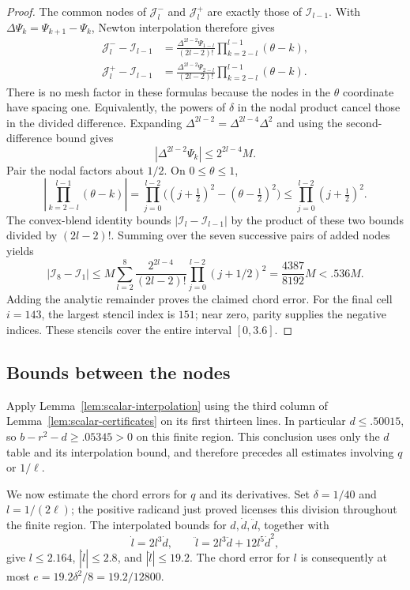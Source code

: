 \begin{proof}
The common nodes of \(\mathcal J_l^-\) and \(\mathcal J_l^+\) are
exactly those of \(\mathcal I_{l-1}\). With
\(\Delta\Psi_k=\Psi_{k+1}-\Psi_k\), Newton interpolation therefore gives
\[
\begin{aligned}
 \mathcal J_l^--\mathcal I_{l-1}
  &=\frac{\Delta^{2l-2}\Psi_{1-l}}{(2l-2)!}
       \prod_{k=2-l}^{l-1}(\theta-k),\\
 \mathcal J_l^+-\mathcal I_{l-1}
  &=\frac{\Delta^{2l-2}\Psi_{2-l}}{(2l-2)!}
       \prod_{k=2-l}^{l-1}(\theta-k).
\end{aligned}
\]
There is no mesh factor in these formulas because the nodes in the
\(\theta\) coordinate have spacing one. Equivalently, the powers of
\(\delta\) in the nodal product cancel those in the divided difference.
Expanding \(\Delta^{2l-2}=\Delta^{2l-4}\Delta^2\) and using the
second-difference bound gives
\[
 |\Delta^{2l-2}\Psi_k|\le 2^{2l-4}M.
\]
Pair the nodal factors about \(1/2\). On \(0\le\theta\le1\),
\[
 \left|\prod_{k=2-l}^{l-1}(\theta-k)\right|
 =\prod_{j=0}^{l-2}\big((j+\tfrac12)^2-(\theta-\tfrac12)^2\big)
 \le\prod_{j=0}^{l-2}(j+\tfrac12)^2.
\]
The convex-blend identity bounds \(|\mathcal I_l-\mathcal I_{l-1}|\)
by the product of these two bounds divided by \((2l-2)!\).
Summing over the seven successive pairs of added nodes yields
\[
 |\mathcal I_8-\mathcal I_1|
 \le M\sum_{l=2}^8
      \frac{2^{2l-4}}{(2l-2)!}\prod_{j=0}^{l-2}(j+1/2)^2
 =\frac{4387}{8192}M<.536M.
\]
Adding the analytic remainder proves the claimed chord error.
For the final cell \(i=143\), the largest stencil index is \(151\);
near zero, parity supplies the negative indices. These stencils cover
the entire interval \([0,3.6]\).
\end{proof}

\subsection{Bounds between the nodes}

Apply Lemma~\ref{lem:scalar-interpolation} using the third column of
Lemma~\ref{lem:scalar-certificates} on its first thirteen lines. In particular \(d\le.50015\), so \(b-r^2-d\ge.05345>0\) on this finite region. This conclusion uses only the \(d\) table and its interpolation bound, and therefore precedes all estimates involving \(q\) or \(1/\ell\).

We now estimate the chord errors for \(q\) and its derivatives.
Set \(\delta=1/40\) and \(l=1/(2\ell)\); the positive radicand just
proved licenses this division throughout the finite region.
The interpolated bounds for \(d,\dot d,\ddot d\), together with
\[
 \dot l=2l^3\dot d,\qquad
 \ddot l=2l^3\ddot d+12l^5\dot d^2,
\]
give \(l\le2.164\), \(|\dot l|\le2.8\), and
\(|\ddot l|\le19.2\). The chord error for \(l\) is consequently at
most \(e=19.2\delta^2/8=19.2/12800\).

